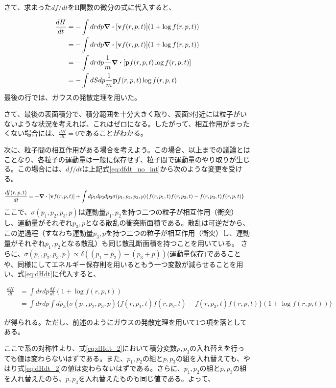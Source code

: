 \documentclass[uplatex,dvipdfmx]{jsarticle}
\begin{document}
さて、求まった$df/dt$をH関数の微分の式に代入すると、

\begin{align*}
    \frac{dH}{dt} &= - \int drdp \div[\vb{v}f(r,p,t)](1+\log f(r,p,t)) \\
        &= - \int drdp \div[\vb{v}f(r,p,t)](1+\log f(r,p,t)) \\
        &= - \int drdp \frac{1}{m} \div[\vb{p}f(r,p,t) \log f(r,p,t)] \\
        &= - \int dSdp \frac{1}{m} \vb{p}f(r,p,t) \log f(r,p,t)
\end{align*}
最後の行では、ガウスの発散定理を用いた。

さて、最後の表面積分で、積分範囲を十分大きく取り、表面S付近には粒子がいないような状況を考えれば、これはゼロになる。したがって、相互作用がまったくない場合には、$\frac{dH}{dt}=0$であることがわかる。

\vspace{1cm}

次に、粒子間の相互作用がある場合を考えよう。この場合、以上までの議論とはことなり、各粒子の運動量は一般に保存せず、粒子間で運動量のやり取りが生じる。この場合には、$df/dt$は上記式\ref{eq:dfdt_no_int}から次のような変更を受ける。

\begin{align}
    \frac{df(r,p,t)}{dt} &= - \div [\vb{v}f(r,p,t)] + \int dp_1dp_2dp_3 \sigma(p_1,p_2,p_3,p) \{f(r,p_1,t)f(r,p_2,t)-f(r, p_3, t)f(r, p,t)\}
\end{align}
ここで、$\sigma(p_1,p_2,p_3,p)$は運動量$p_1,p_2$を持つ二つの粒子が相互作用（衝突）し、運動量がそれぞれ$p_3,p$となる散乱の衝突断面積である。散乱は可逆だから、この逆過程（すなわち運動量$p_3,p$を持つ二つの粒子が相互作用（衝突）し、運動量がそれぞれ$p_1,p_2$となる散乱）も同じ散乱断面積を持つことを用いている。
さらに、$\sigma(p_1,p_2,p_3,p) \propto \delta((p_1+p_2)-(p_3+p))$(運動量保存)であることや、同様にしてエネルギー保存則を用いるともう一つ変数が減らせることを用い、式\ref{eq:dHdt}に代入すると、

\begin{align}
    \frac{dH}{dt} &= \int drdp \frac{df}{dt}(1+\log f(r,p,t))\\
        &= \int drdp \int dp_3 \{\sigma(p_1,p_2,p_3,p) \{f(r,p_1,t)f(r,p_2,t)-f(r, p_3, t)f(r, p,t)\}(1+\log f(r,p,t))\} \label{eq:dHdt_2}
\end{align}

が得られる。ただし、前述のようにガウスの発散定理を用いて1つ項を落としてある。

ここで系の対称性より、式\ref{eq:dHdt_2}において積分変数$p,p_3$の入れ替えを行っても値は変わらないはずである。また、$p_1,p_2$の組と$p,p_3$の組を入れ替えても、やはり式\ref{eq:dHdt_2}の値は変わらないはずである。さらに、$p_1,p_2$の組と$p,p_3$の組を入れ替えたのち、$p, p_3$を入れ替えたものも同じ値である。よって、
\end{document}
